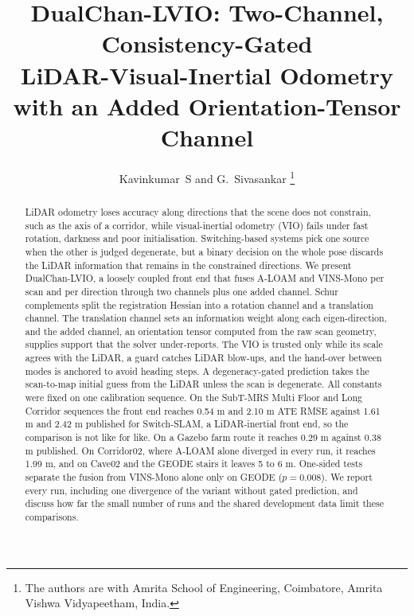 \documentclass[journal]{IEEEtran}
\begin{document}
\title{DualChan-LVIO: Two-Channel, Consistency-Gated\\ LiDAR-Visual-Inertial Odometry with an Added Orientation-Tensor Channel}

\author{Kavinkumar~S and G.~Sivasankar%
\thanks{The authors are with Amrita School of Engineering, Coimbatore, Amrita Vishwa Vidyapeetham, India.}}


\maketitle

\begin{abstract}
LiDAR odometry loses accuracy along directions that the scene does not constrain, such as the axis of a corridor, while visual-inertial odometry (VIO) fails under fast rotation, darkness and poor initialisation. Switching-based systems pick one source when the other is judged degenerate, but a binary decision on the whole pose discards the LiDAR information that remains in the constrained directions. We present DualChan-LVIO, a loosely coupled front end that fuses A-LOAM and VINS-Mono per scan and per direction through two channels plus one added channel. Schur complements split the registration Hessian into a rotation channel and a translation channel. The translation channel sets an information weight along each eigen-direction, and the added channel, an orientation tensor computed from the raw scan geometry, supplies support that the solver under-reports. The VIO is trusted only while its scale agrees with the LiDAR, a guard catches LiDAR blow-ups, and the hand-over between modes is anchored to avoid heading steps. A degeneracy-gated prediction takes the scan-to-map initial guess from the LiDAR unless the scan is degenerate. All constants were fixed on one calibration sequence. On the SubT-MRS Multi Floor and Long Corridor sequences the front end reaches 0.54 m and 2.10 m ATE RMSE against 1.61 m and 2.42 m published for Switch-SLAM, a LiDAR-inertial front end, so the comparison is not like for like. On a Gazebo farm route it reaches 0.29 m against 0.38 m published. On Corridor02, where A-LOAM alone diverged in every run, it reaches 1.99 m, and on Cave02 and the GEODE stairs it leaves 5 to 6 m. One-sided tests separate the fusion from VINS-Mono alone only on GEODE ($p=0.008$). We report every run, including one divergence of the variant without gated prediction, and discuss how far the small number of runs and the shared development data limit these comparisons.
\end{abstract}
\end{document}
